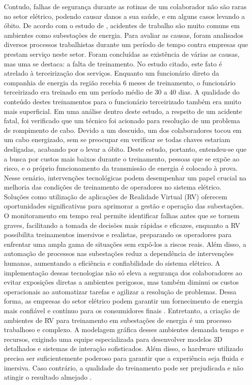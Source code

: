 Contudo, falhas de segurança durante as rotinas de um colaborador não são raras no setor elétrico, podendo causar danos a sua saúde, e em alguns casos levando a óbito. De acordo com o estudo de \cite{lima2021precarizaccao}, acidentes de trabalho são muito comuns em ambientes como subestações de energia. Para avaliar as causas, foram analisados diversos processos trabalhistas durante um período de tempo contra empresas que prestam serviço neste setor. Foram concluídas as existência de várias as causas, mas uma se destaca: a falta de treinamento. No estudo citado, este fato é atrelado à terceirização dos serviços. Enquanto um funcionário direto da companhia de energia da região recebia 6 meses de treinamento, o funcionário terceirizado era treinado em um período médio de 30 a 40 dias. A qualidade do conteúdo destes treinamentos para o funcionário terceirizado também era muito mais superficial. Em uma análise dentro deste estudo, a respeito de um acidente fatal, foi verificado que um técnico foi acionado para resolução de um problema de rompimento de cabo. Devido a um descuido, um dos colaboradores tocou em um cabo energizado, sem se preocupar em verificar se todas chaves estariam desligadas, acabando por o levar a óbito. Deste estudo, portanto, entendeu-se que a busca por custos mais baixos durante o treinamento, pessoas que se expõe ao risco, e o próprio funcionamento da transmissão de energia é colocado à prova. 
Nesse cenário, intervenções tecnológicas podem desempenhar um papel crucial na melhoria das condições de treinamento de operadores no sistema elétrico. Soluções como utilização de aplicações de Realidade Virtual (RV) oferecem oportunidades significativas para aprimorar a gestão e operação das subestações. O monitoramento em tempo real permite identificar falhas antes que se tornem graves, facilitando a tomada de decisões mais rápidas e eficazes, enquanto a RV possibilita treinamentos imersivos e realistas, preparando os operadores para enfrentar uma ampla gama de situações sem expô-los a riscos reais. Além disso, a automação de processos nas subestações reduz a dependência de intervenções humanas, aumentando a eficiência e confiabilidade do sistema elétrico. A implementação dessas tecnologias não só eleva a segurança dos colaboradores ao evitar exposições diretas a ambientes perigosos, mas também diminui os custos operacionais ao automatizar tarefas e agilizar a resolução de problemas. Dessa forma, as empresas do setor elétrico podem garantir um fornecimento de energia mais confiável e contínuo para os consumidores finais \cite{zhou2016big}.
Entretanto, a criação de ambientes de RV para treinamento em subestações de energia é um processo trabalhoso e complexo. A modelagem gráfica desses ambientes demanda tempo e recursos, exigindo uma equipe especializada para desenvolver modelos 3D detalhados e sistemas de interação sofisticados. Além disso, o hardware utilizado precisa ser suficientemente poderoso para garantir que a experiência seja fluida e imersiva. Caso contrário, a qualidade do treinamento pode ser prejudicada e não atingir o resultado almejado \cite{barreto2022proposta}.

